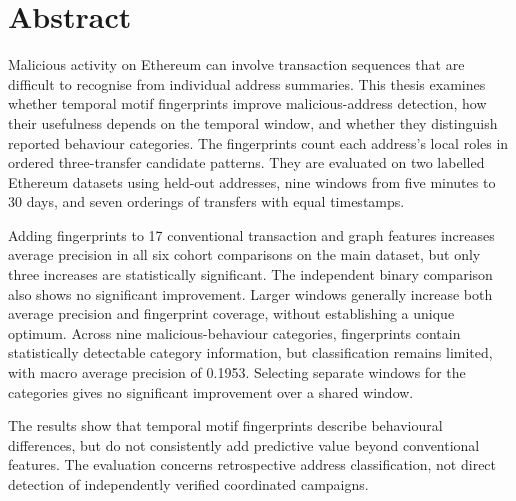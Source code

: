 \chapter*{Abstract}
Malicious activity on Ethereum can involve transaction sequences that are
difficult to recognise from individual address summaries. This thesis examines
whether temporal motif fingerprints improve malicious-address detection, how
their usefulness depends on the temporal window, and whether they distinguish
reported behaviour categories. The fingerprints count each address's local
roles in ordered three-transfer candidate patterns. They are evaluated on two
labelled Ethereum datasets using held-out addresses, nine windows from five
minutes to 30 days, and seven orderings of transfers with equal timestamps.

Adding fingerprints to 17 conventional transaction and graph features increases
average precision in all six cohort comparisons on the main dataset, but only
three increases are statistically significant. The independent binary comparison
also shows no significant improvement. Larger windows generally increase both
average precision and fingerprint coverage, without establishing a unique
optimum. Across nine malicious-behaviour categories, fingerprints contain
statistically detectable category information, but classification remains
limited, with macro average precision of 0.1953. Selecting separate windows for
the categories gives no significant improvement over a shared window.

The results show that temporal motif fingerprints describe behavioural
differences, but do not consistently add predictive value beyond conventional
features. The evaluation concerns retrospective address classification, not
direct detection of independently verified coordinated campaigns.

